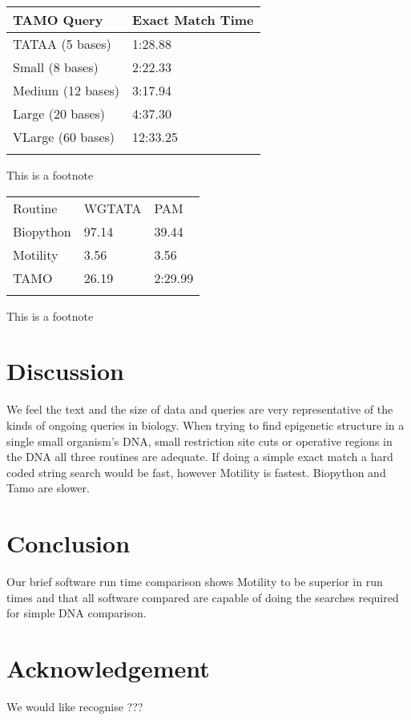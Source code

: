 \documentclass{bioinfo}
\begin{document}
\begin{methods}
\begin{table}[!t]
{\begin{tabular}{ll}\toprule
TAMO Query & Exact Match Time \\\midrule
TATAA (5 bases)& 1:28.88 \\
Small (8 bases)& 2:22.33 \\
Medium (12 bases)& 3:17.94 \\
Large (20 bases)& 4:37.30 \\
VLarge (60 bases)& 12:33.25 \\\botrule
\end{tabular}}{This is a footnote}
\end{table}

\begin{table}[!t]
{\begin{tabular}{lll}\toprule
Routine & WGTATA & PAM\\
Biopython & 97.14 & 39.44\\
Motility & 3.56 & 3.56 \\
TAMO & 26.19 & 2:29.99 \\\botrule
\end{tabular}}{This is a footnote}
\end{table}

\end{methods}

\section{Discussion}
We feel the text and the size of data and queries are very representative 
of the kinds of ongoing queries in biology. When trying to find
epigenetic structure in a single small organism's DNA,
small restriction site cuts or operative regions in the DNA all 
three routines are adequate.
If doing a simple exact match a hard coded string search would be fast,
however Motility is fastest.  
Biopython and Tamo are slower.


\section{Conclusion}
Our brief software run time comparison shows Motility 
to be superior in run times and that all software compared
are capable of doing the searches required for simple DNA comparison.

\section*{Acknowledgement}
We would like recognise ???
\end{document}
